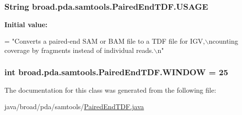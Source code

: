 \hypertarget{classbroad_1_1pda_1_1samtools_1_1_paired_end_t_d_f_a21ab21c18e8c1f0fafc1f67da4c595d3}{
\subsubsection[{U\+S\+A\+G\+E}]{\setlength{\rightskip}{0pt plus 5cm}String broad.\+pda.\+samtools.\+Paired\+End\+T\+D\+F.\+U\+S\+A\+G\+E}}\label{classbroad_1_1pda_1_1samtools_1_1_paired_end_t_d_f_a21ab21c18e8c1f0fafc1f67da4c595d3}
{\bfseries Initial value\+:}
\begin{DoxyCode}
=
                \textcolor{stringliteral}{"Converts a paired-end SAM or BAM file to a TDF file for IGV,\(\backslash\)ncounting coverage by
       fragments instead of individual reads.\(\backslash\)n"}
\end{DoxyCode}
\hypertarget{classbroad_1_1pda_1_1samtools_1_1_paired_end_t_d_f_a45564a0767ae3d8dd6706b9b093b980d}{
\subsubsection[{W\+I\+N\+D\+O\+W}]{\setlength{\rightskip}{0pt plus 5cm}int broad.\+pda.\+samtools.\+Paired\+End\+T\+D\+F.\+W\+I\+N\+D\+O\+W = 25}}\label{classbroad_1_1pda_1_1samtools_1_1_paired_end_t_d_f_a45564a0767ae3d8dd6706b9b093b980d}


The documentation for this class was generated from the following file\+:\begin{DoxyCompactItemize}
\item 
java/broad/pda/samtools/\hyperlink{_paired_end_t_d_f_8java}{Paired\+End\+T\+D\+F.\+java}\end{DoxyCompactItemize}
